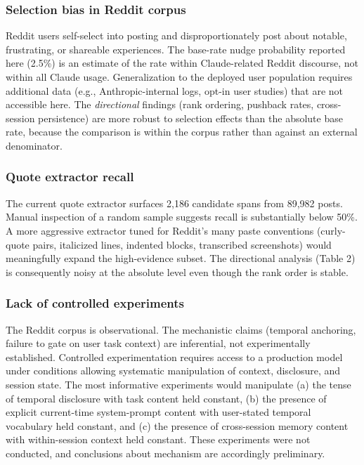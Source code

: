 \documentclass[11pt]{article}
\begin{document}
\subsubsection{Selection bias in Reddit corpus}

Reddit users self-select into posting and disproportionately post about notable, frustrating, or shareable experiences. The base-rate nudge probability reported here (2.5\%) is an estimate of the rate within Claude-related Reddit discourse, not within all Claude usage. Generalization to the deployed user population requires additional data (e.g., Anthropic-internal logs, opt-in user studies) that are not accessible here. The \emph{directional} findings (rank ordering, pushback rates, cross-session persistence) are more robust to selection effects than the absolute base rate, because the comparison is within the corpus rather than against an external denominator.

\subsubsection{Quote extractor recall}

The current quote extractor surfaces 2,186 candidate spans from 89,982 posts. Manual inspection of a random sample suggests recall is substantially below 50\%. A more aggressive extractor tuned for Reddit's many paste conventions (curly-quote pairs, italicized lines, indented blocks, transcribed screenshots) would meaningfully expand the high-evidence subset. The directional analysis (Table 2) is consequently noisy at the absolute level even though the rank order is stable.

\subsubsection{Lack of controlled experiments}

The Reddit corpus is observational. The mechanistic claims (temporal anchoring, failure to gate on user task context) are inferential, not experimentally established. Controlled experimentation requires access to a production model under conditions allowing systematic manipulation of context, disclosure, and session state. The most informative experiments would manipulate (a) the tense of temporal disclosure with task content held constant, (b) the presence of explicit current-time system-prompt content with user-stated temporal vocabulary held constant, and (c) the presence of cross-session memory content with within-session context held constant. These experiments were not conducted, and conclusions about mechanism are accordingly preliminary.
\end{document}
